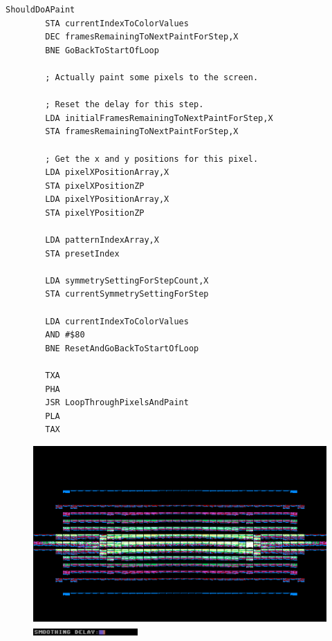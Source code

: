 \begin{lstlisting}[caption=From \icode{MainPaintLoop}.]
ShouldDoAPaint   
        STA currentIndexToColorValues
        DEC framesRemainingToNextPaintForStep,X
        BNE GoBackToStartOfLoop

        ; Actually paint some pixels to the screen.

        ; Reset the delay for this step.
        LDA initialFramesRemainingToNextPaintForStep,X
        STA framesRemainingToNextPaintForStep,X

        ; Get the x and y positions for this pixel.
        LDA pixelXPositionArray,X
        STA pixelXPositionZP
        LDA pixelYPositionArray,X
        STA pixelYPositionZP

        LDA patternIndexArray,X
        STA presetIndex

        LDA symmetrySettingForStepCount,X
        STA currentSymmetrySettingForStep

        LDA currentIndexToColorValues
        AND #$80
        BNE ResetAndGoBackToStartOfLoop

        TXA 
        PHA 
        JSR LoopThroughPixelsAndPaint
        PLA 
        TAX 
\end{lstlisting}
\clearpage
\begin{figure}[H]
    \centering
    \begin{adjustbox}{width=10.5cm,margin=0cm}
      \includegraphics[width=12cm]{src/delay/pixelhist-0.png}%
    \end{adjustbox}
    \caption{
      \includegraphics[width=4cm]{src/delay/delay-low.png}%
      }
\end{figure}
